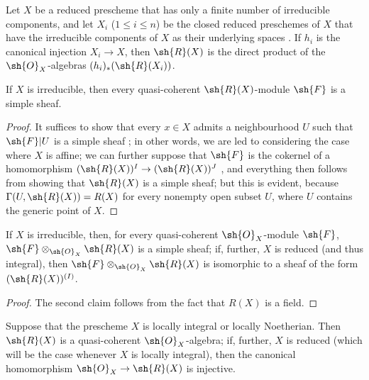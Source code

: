 \begin{corollary}[7.3.4]
\label{I.7.3.4}
Let $X$ be a reduced prescheme that has only a finite number of irreducible components, and let $X_i$ ($1\leq i\leq n$) be the closed reduced preschemes of $X$ that have the irreducible components of $X$ as their underlying spaces .
If $h_i$ is the canonical injection $X_i\to X$, then $\sh{R}(X)$ is the direct product of the $\sh{O}_X$-algebras $(h_i)_*(\sh{R}(X_i))$.
\end{corollary}

\begin{corollary}[7.3.5]
\label{I.7.3.5}
If $X$ is irreducible, then every quasi-coherent $\sh{R}(X)$-module $\sh{F}$ is a simple sheaf.
\end{corollary}

\begin{proof}
It suffices to show that every $x\in X$ admits a neighbourhood $U$ such that $\sh{F}|U$ is a simple sheaf ; in other words, we are led to considering the case where $X$ is affine; we can further suppose that $\sh{F}$ is the cokernel of a homomorphism $(\sh{R}(X))^{I}\to(\sh{R}(X))^{J}$ , and everything then follows from showing that $\sh{R}(X)$ is a simple sheaf; but this is evident, because $\Gamma(U,\sh{R}(X))=R(X)$ for every nonempty open subset $U$, where $U$ contains the generic point of $X$.
\end{proof}

\begin{corollary}[7.3.6]
\label{I.7.3.6}
If $X$ is irreducible, then, for every quasi-coherent $\sh{O}_X$-module $\sh{F}$, $\sh{F}\otimes_{\sh{O}_X}\sh{R}(X)$ is a simple sheaf; if, further, $X$ is reduced (and thus integral), then $\sh{F}\otimes_{\sh{O}_X}\sh{R}(X)$ is isomorphic to a sheaf of the form $(\sh{R}(X))^{(I)}$.
\end{corollary}

\begin{proof}
The second claim follows from the fact that $R(X)$ is a field.
\end{proof}

\begin{proposition}[7.3.7]
\label{I.7.3.7}
Suppose that the prescheme $X$ is locally integral or locally
Noetherian.
Then $\sh{R}(X)$ is a quasi-coherent $\sh{O}_X$-algebra; if, further, $X$ is reduced (which will be the case whenever $X$ is locally integral), then the canonical homomorphism $\sh{O}_X\to\sh{R}(X)$ is injective.
\end{proposition}

